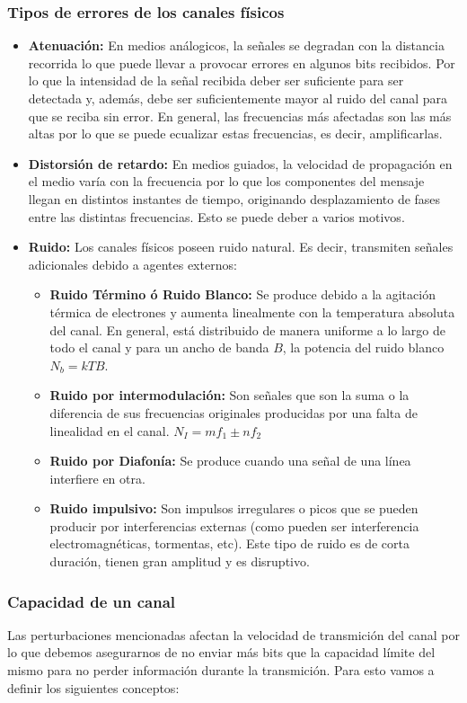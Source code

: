 \subsubsection{Tipos de errores de los canales físicos}
\begin{itemize}
  \item \textbf{Atenuación:}  En medios análogicos, la señales se degradan con la distancia recorrida lo que puede llevar a provocar errores en algunos bits recibidos. Por lo que la intensidad de la señal recibida deber ser suficiente para ser detectada y, además, debe ser suficientemente mayor al ruido del canal para que se reciba sin error. En general, las frecuencias más afectadas son las más altas por lo que se puede ecualizar estas frecuencias, es decir, amplificarlas.
  \item \textbf{Distorsión de retardo:} En medios guiados, la velocidad de propagación en el medio varía con la frecuencia por lo que los componentes del mensaje llegan en distintos instantes de tiempo, originando desplazamiento de fases entre las distintas frecuencias. Esto se puede deber a varios motivos.
\item \textbf{Ruido:} Los canales físicos poseen ruido natural. Es decir, transmiten señales adicionales debido a agentes externos:
\begin{itemize}
  \item \textbf{Ruido Término ó Ruido Blanco:} Se produce debido a la agitación térmica de electrones y aumenta linealmente con la temperatura absoluta del canal. En general, está distribuido de manera uniforme a lo largo de todo el canal y para un ancho de banda \(B\), la potencia del ruido blanco \(N_b = kTB\). 
  \item\textbf{Ruido por intermodulación:} Son señales que son la suma o la diferencia de sus frecuencias originales producidas por una falta de linealidad en el canal. \(N_I = m f_1 \pm n f_2\)
  \item\textbf{Ruido por Diafonía:} Se produce cuando una señal de una línea interfiere en otra.
  \item\textbf{Ruido impulsivo:} Son impulsos irregulares o picos que se pueden producir por interferencias externas (como pueden ser interferencia electromagnéticas, tormentas, etc). Este tipo de ruido es de corta duración, tienen gran amplitud y es disruptivo.
\end{itemize}
\end{itemize}

\subsubsection{Capacidad de un canal}
Las perturbaciones mencionadas afectan la velocidad de transmición del canal por lo que debemos asegurarnos de no enviar más bits que la capacidad límite del mismo para no perder información durante la transmición. Para esto vamos a definir los siguientes conceptos:

